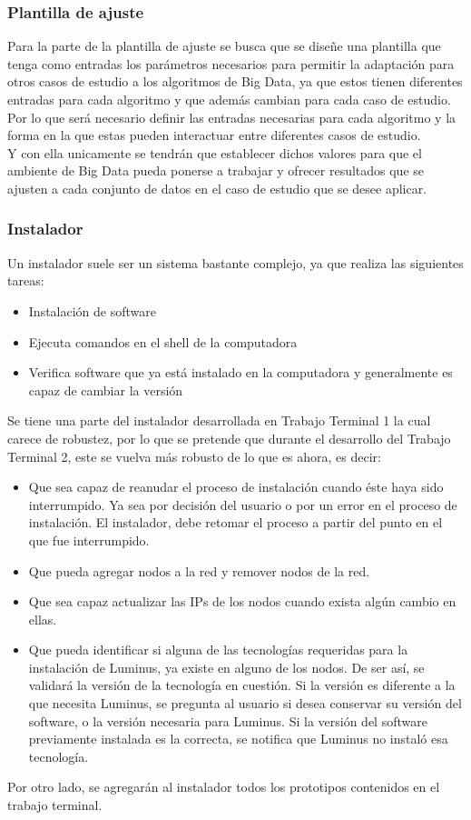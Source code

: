 \subsubsection{Plantilla de ajuste}
Para la parte de la plantilla de ajuste se busca que se diseñe una plantilla que tenga como entradas los parámetros necesarios para permitir la adaptación para otros casos de estudio a los algoritmos de Big Data, ya que estos tienen diferentes entradas para cada algoritmo y que además cambian para cada caso de estudio.
\\
Por lo que será necesario definir las entradas necesarias para cada algoritmo y la forma en la que estas pueden interactuar entre diferentes casos de estudio.
\\
Y con ella unicamente se tendrán que establecer dichos valores para que el ambiente de Big Data pueda ponerse a trabajar y ofrecer resultados que se ajusten a cada conjunto de datos en el caso de estudio que se desee aplicar.

\subsubsection{Instalador}
Un instalador suele ser un sistema bastante complejo, ya que realiza las siguientes tareas:
\begin{itemize}
	\item Instalación de software
	\item Ejecuta comandos en el shell de la computadora
	\item Verifica software que ya está instalado en la computadora y generalmente es capaz de cambiar la versión
\end{itemize}
Se tiene una parte del instalador desarrollada en Trabajo Terminal 1 la cual carece de robustez, por lo que se pretende que durante el desarrollo del Trabajo Terminal 2, este se vuelva más robusto de lo que es ahora, es decir:
\begin{itemize}
	\item Que sea capaz de reanudar el proceso de instalación cuando éste haya sido interrumpido. Ya sea por decisión del usuario o por un error en el proceso de instalación. El instalador, debe retomar el proceso a partir del punto en el que fue interrumpido.
	\item Que pueda agregar nodos a la red y remover nodos de la red.
	\item Que sea capaz actualizar las IPs de los nodos cuando exista algún cambio en ellas.
	\item Que pueda identificar si alguna de las tecnologías requeridas para la instalación de Luminus, ya existe en alguno de los nodos. De ser así, se validará la versión de la tecnología en cuestión. Si la versión es diferente a la que necesita Luminus, se pregunta al usuario si desea conservar su versión del software, o la versión necesaria para Luminus. Si la versión del software previamente instalada es la correcta, se notifica que Luminus no instaló esa tecnología.
\end{itemize}
Por otro lado, se agregarán al instalador todos los prototipos contenidos en el trabajo terminal.
